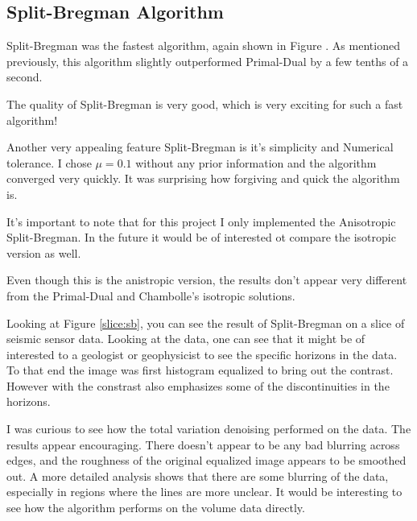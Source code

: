 \documentclass[11pt]{article}
\begin{document}
\subsection{Split-Bregman Algorithm}

Split-Bregman was the fastest algorithm, again shown in Figure \cite{fig:timing}.
As mentioned previously, this algorithm slightly outperformed Primal-Dual by a few tenths of a second.

The quality of Split-Bregman is very good, which is very exciting for such a fast algorithm!

Another very appealing feature Split-Bregman is it's simplicity and Numerical tolerance. 
I chose $\mu=0.1$ without any prior information and the algorithm converged very quickly.
It was surprising how forgiving and quick the algorithm is.

It's important to note that for this project I only implemented the Anisotropic Split-Bregman.
In the future it would be of interested ot compare the isotropic version as well.

Even though this is the anistropic version, the results don't appear very different from the Primal-Dual and Chambolle's isotropic solutions.

Looking at Figure \ref{slice:sb}, you can see the result of Split-Bregman on a slice of seismic sensor data.
Looking at the data, one can see that it might be of interested to a geologist or geophysicist to see the specific horizons in the data.
To that end the image was first histogram equalized to bring out the contrast.
However with the constrast also emphasizes some of the discontinuities in the horizons.

I was curious to see how the total variation denoising performed on the data.
The results appear encouraging. 
There doesn't appear to be any bad blurring across edges, and the roughness of the original equalized image appears to be smoothed out.
A more detailed analysis shows that there are some blurring of the data, especially in regions where the lines are more unclear.
It would be interesting to see how the algorithm performs on the volume data directly.
\end{document}
